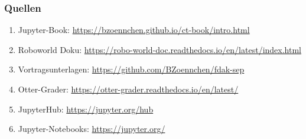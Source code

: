 \documentclass[german,aspectratio=169]{beamer}
\begin{document}
\appendix

\begin{frame}[plain]
	\frametitle{Quellen}
	\begin{enumerate}[label = ]
		\item Jupyter-Book: \href{https://bzoennchen.github.io/ct-book/intro.html}{https://bzoennchen.github.io/ct-book/intro.html}
		\item Roboworld Doku: \href{https://robo-world-doc.readthedocs.io/en/latest/index.html}{https://robo-world-doc.readthedocs.io/en/latest/index.html}
		\item Vortragsunterlagen: \href{https://github.com/BZoennchen/fdak-sep}{https://github.com/BZoennchen/fdak-sep}
		\item Otter-Grader: \href{https://otter-grader.readthedocs.io/en/latest/}{https://otter-grader.readthedocs.io/en/latest/} 	
		\item JupyterHub: \href{https://jupyter.org/hub}{https://jupyter.org/hub}
		\item Jupyter-Notebooks: \href{https://jupyter.org/}{https://jupyter.org/}
	\end{enumerate}
\end{frame}

\end{document}
